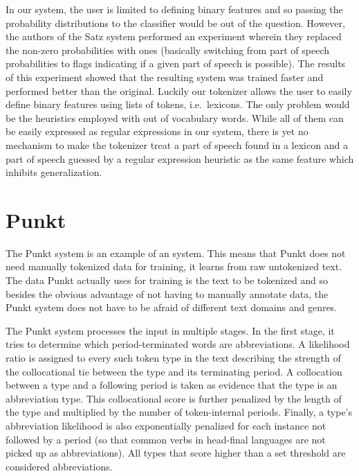 In our system, the user is limited to defining binary features and so passing
the probability distributions to the classifier would be out of the question.
However, the authors of the Satz system performed an experiment wherein they
replaced the non-zero probabilities with ones (basically switching from part of
speech probabilities to flags indicating if a given part of speech is
possible). The results of this experiment showed that the resulting system was
trained faster and performed better than the original. Luckily our tokenizer
allows the user to easily define binary features using lists of tokens, i.e.\
lexicons. The only problem would be the heuristics employed with out of
vocabulary words. While all of them can be easily expressed as regular
expressions in our system, there is yet no mechanism to make the tokenizer
treat a part of speech found in a lexicon and a part of speech guessed by a
regular expression heuristic as the same feature which inhibits generalization.

\section{Punkt}
\label{sec:survey-punkt}

The Punkt system \cite{sbd-punkt} is an example of an \newterm{unsupervised
machine-learning} system. This means that Punkt does not need manually
tokenized data for training, it learns from raw untokenized text. The data
Punkt actually uses for training is the text to be tokenized and so besides the
obvious advantage of not having to manually annotate data, the Punkt system
does not have to be afraid of different text domains and genres.

The Punkt system processes the input in multiple stages. In the first stage, it
tries to determine which period-terminated words are abbreviations. A
likelihood ratio is assigned to every such token type in the text describing
the strength of the collocational tie between the type and its
terminating period. A collocation between a type and a following period is
taken as evidence that the type is an abbreviation type. This collocational
score is further penalized by the length of the type and multiplied by the
number of token-internal periods. Finally, a type's abbreviation likelihood is
also exponentially penalized for each instance not followed by a period (so
that common verbs in head-final languages are not picked up as abbreviations).
All types that score higher than a set threshold are considered abbreviations.

